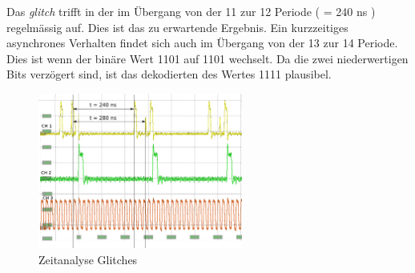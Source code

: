  Das \textit{glitch} trifft in der im Übergang von der 11 zur 12 Periode ( = 240 ns ) regelmässig auf. Dies ist das zu erwartende Ergebnis. Ein kurzzeitiges asynchrones Verhalten findet sich auch im Übergang von der 13 zur 14 Periode. Dies ist wenn der binäre Wert 1101 auf 1101 wechselt. Da die zwei niederwertigen Bits verzögert sind, ist das dekodierten des Wertes 1111 plausibel.\\
\begin{figure}[H]
	\includegraphics[width=0.6\textwidth]{images/glitch/Glitch_2_timing.png}
	\caption{Zeitanalyse Glitches}
	\label{fig.glitch.result_2}
\end{figure}



